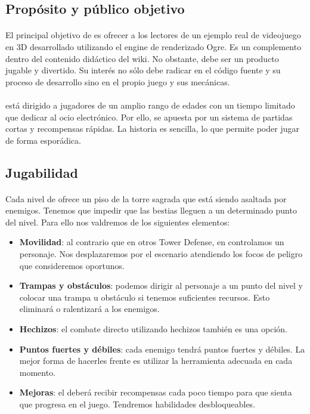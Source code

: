 \subsection{Propósito y público objetivo}
\label{sec:int-publico}

\paragraph{}
El principal objetivo de \juego es ofrecer a los lectores de \wiki un ejemplo
real de videojuego en 3D desarrollado utilizando el engine de renderizado
Ogre. Es un complemento dentro del contenido didáctico del wiki. No obstante,
debe ser un producto jugable y divertido. Su interés no sólo debe radicar
en el código fuente y su proceso de desarrollo sino en el propio juego
y sus mecánicas.

\paragraph{}
\juego está dirigido a jugadores de un amplio rango de edades con un tiempo
limitado que dedicar al ocio electrónico. Por ello, se apuesta por un sistema
de partidas cortas y recompensas rápidas. La historia es sencilla, lo que
permite poder jugar de forma esporádica.

\subsection{Jugabilidad}
\label{sec:int-jugabilidad}

\paragraph{}
Cada nivel de \juego ofrece un piso de la torre sagrada que está siendo
asaltada por enemigos. Tenemos que impedir que las bestias lleguen a un
determinado punto del nivel. Para ello nos valdremos de los siguientes elementos:

\begin{itemize}
    \item \textbf{Movilidad}: al contrario que en otros Tower Defense, en
    \juego controlamos un personaje. Nos desplazaremos por el escenario
    atendiendo los focos de peligro que consideremos oportunos.
    \item \textbf{Trampas y obstáculos}: podemos dirigir al personaje a
    un punto del nivel y colocar una trampa u obstáculo si tenemos
    suficientes recursos. Esto eliminará o ralentizará a los enemigos.
    \item \textbf{Hechizos}: el combate directo utilizando hechizos también
    es una opción.
    \item \textbf{Puntos fuertes y débiles}: cada enemigo tendrá puntos
    fuertes y débiles. La mejor forma de hacerles frente es utilizar la
    herramienta adecuada en cada momento.
    \item \textbf{Mejoras}: el \jugador deberá recibir recompensas cada
    poco tiempo para que sienta que progresa en el juego. Tendremos habilidades
    desbloqueables.
\end{itemize}

